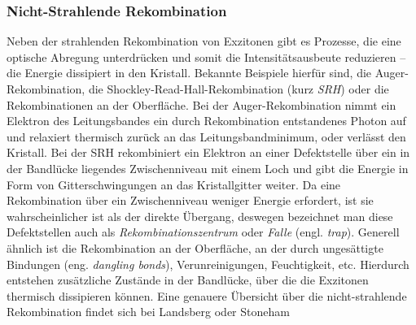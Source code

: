 \subsubsection{Nicht-Strahlende Rekombination}
Neben der strahlenden Rekombination von Exzitonen gibt es Prozesse, die eine optische Abregung unterdrücken und somit die Intensitätsausbeute reduzieren – die Energie dissipiert in den Kristall. Bekannte Beispiele hierfür sind, die Auger-Rekombination, die Shockley-Read-Hall-Rekombination (kurz \textit{SRH}) oder die Rekombinationen an der Oberfläche. Bei der Auger-Rekombination nimmt ein Elektron des Leitungsbandes ein durch Rekombination entstandenes Photon auf und relaxiert thermisch zurück an das Leitungsbandminimum, oder verlässt den Kristall. Bei der SRH rekombiniert ein Elektron an einer Defektstelle über ein in der Bandlücke liegendes Zwischenniveau mit einem Loch und gibt die Energie in Form von Gitterschwingungen an das Kristallgitter weiter. Da eine Rekombination über ein Zwischenniveau weniger Energie erfordert, ist sie wahrscheinlicher ist als der direkte Übergang, deswegen bezeichnet man diese Defektstellen auch als \textit{Rekombinationszentrum} oder \textit{Falle} (engl. \textit{trap}). Generell ähnlich ist die Rekombination an der Oberfläche, an der durch ungesättigte Bindungen (eng. \textit{dangling bonds}), Verunreinigungen, Feuchtigkeit, etc. Hierdurch entstehen zusätzliche Zustände in der Bandlücke, über die die Exzitonen thermisch dissipieren können. Eine genauere Übersicht über die nicht-strahlende Rekombination findet sich bei Landsberg oder Stoneham \cite{Landsberg.1970,Stoneham.1981} 
